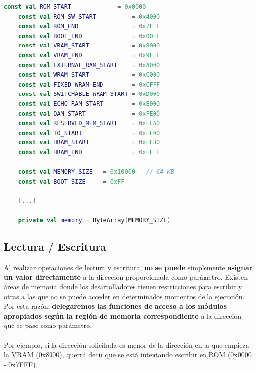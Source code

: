 \begin{lstlisting}[language=Kotlin, caption={Declaraciones iniciales de Memoria}, label={code:kotlinmem}]
    const val ROM_START             = 0x0000
    const val ROM_SW_START          = 0x4000
    const val ROM_END               = 0x7FFF
    const val BOOT_END              = 0x00FF
    const val VRAM_START            = 0x8000
    const val VRAM_END              = 0x9FFF
    const val EXTERNAL_RAM_START    = 0xA000
    const val WRAM_START            = 0xC000
    const val FIXED_WRAM_END        = 0xCFFF
    const val SWITCHABLE_WRAM_START = 0xD000
    const val ECHO_RAM_START        = 0xE000
    const val OAM_START             = 0xFE00
    const val RESERVED_MEM_START    = 0xFEA0
    const val IO_START              = 0xFF00
    const val HRAM_START            = 0xFF80
    const val HRAM_END              = 0xFFFE
    
    const val MEMORY_SIZE   = 0x10000   // 64 KB
    const val BOOT_SIZE     = 0xFF

    [...]

    private val memory = ByteArray(MEMORY_SIZE)
\end{lstlisting}

\subsection{Lectura / Escritura}

Al realizar operaciones de lectura y escritura, \textbf{no se puede} simplemente \textbf{asignar un valor directamente} a la dirección proporcionada como parámetro. Existen áreas de memoria donde los desarrolladores tienen restricciones para escribir y otras a las que no se puede acceder en determinados momentos de la ejecución. Por esta razón, \textbf{delegaremos las funciones de acceso a los módulos apropiados según la región de memoria correspondiente} a la dirección que se pase como parámetro.
\\\\
Por ejemplo, si la dirección solicitada es menor de la dirección en la que empieza la VRAM (0x8000), querrá decir que se está intentando escribir en ROM (0x0000 - 0x7FFF).


